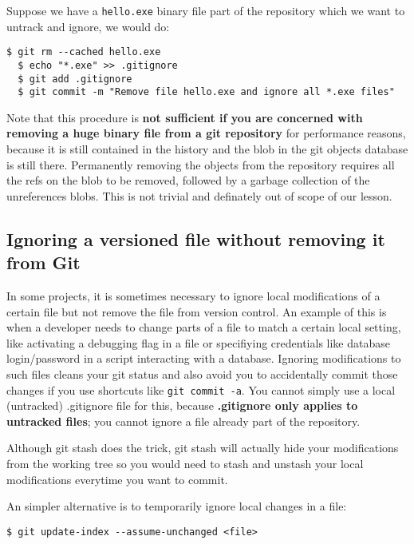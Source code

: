 \documentclass{../common/tufte-latex/tufte-handout}
\begin{document}
Suppose we have a \texttt{hello.exe} binary file part of the repository which we want to untrack and ignore, we would do:
\begin{lstlisting}[style=BashInputStyle]
  $ git rm --cached hello.exe
  $ echo "*.exe" >> .gitignore
  $ git add .gitignore
  $ git commit -m "Remove file hello.exe and ignore all *.exe files"
\end{lstlisting}

Note that this procedure is \textbf{not sufficient if you are concerned with removing a huge binary file from a git repository} for performance reasons, because it is still contained in the history and the blob in the git objects database is still there.
Permanently removing the objects from the repository requires all the refs on the blob to be removed, followed by a garbage collection of the unreferences blobs.
This is not trivial and definately out of scope of our lesson.

\subsection{Ignoring a versioned file without removing it from Git}
In some projects, it is sometimes necessary to ignore local modifications of a certain file but not remove the file from version control.
An example of this is when a developer needs to change parts of a file to match a certain local setting, like activating a debugging flag in a file or specifiying credentials like database login/password in a script interacting with a database.
Ignoring modifications to such files cleans your git status and also avoid you to accidentally commit those changes if you use shortcuts like \texttt{git commit -a}.
You cannot simply use a local (untracked) .gitignore file for this, because \textbf{.gitignore only applies to untracked files}; you cannot ignore a file already part of the repository.

Although git stash does the trick, git stash will actually hide your modifications from the working tree so you would need to stash and unstash your local modifications everytime you want to commit.

An simpler alternative is to temporarily ignore local changes in a file:
\begin{lstlisting}[style=BashInputStyle]
  $ git update-index --assume-unchanged <file>
\end{lstlisting}
\end{document}
